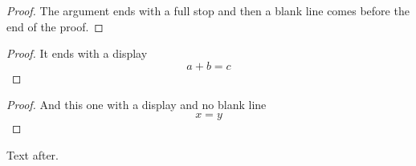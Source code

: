 \documentclass{article}
\begin{document}
\begin{proof}
The argument ends with a full stop and then a blank line comes before the end of the proof.

\end{proof}
\begin{proof}
It ends with a display
\[ a + b = c \]

\end{proof}
\begin{proof}
And this one with a display and no blank line
\[ x = y \]
\end{proof}
Text after.
\end{document}

